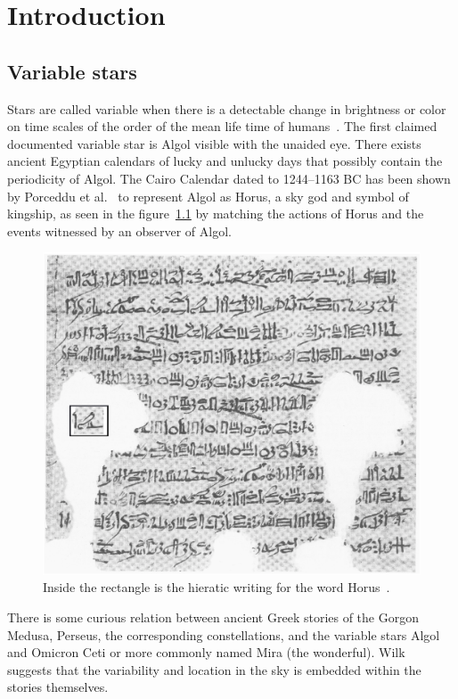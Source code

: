 \chapter{Introduction}
\label{ch:intro}

\section{Variable stars}
Stars are called variable when there is a detectable change in brightness or color on time scales of the order
of the mean life time of humans~\cite{percy_2007, sterken_1996}.
The first claimed documented variable star is Algol visible with the unaided eye.
There exists ancient Egyptian calendars of lucky and unlucky days that possibly contain the periodicity of Algol\cite{porceddu_2008, porceddu_2018}.
The Cairo Calendar dated to 1244--1163 BC has been shown by Porceddu et al.~\cite{porceddu_2015} to represent Algol as Horus, a sky god and
symbol of kingship,
as seen in the figure~\ref{fig:horus} by matching the actions of Horus and the events witnessed by an observer of Algol.

\begin{figure}[h]
    \centering
    \includegraphics[width=\columnwidth]{figures/horus.eps}
    \caption{Inside the rectangle is the hieratic writing for the word Horus~\protect\cite{porceddu_2015}.}
\label{fig:horus}
\end{figure}

There is some curious relation between ancient Greek stories of the Gorgon Medusa, Perseus, the corresponding constellations, 
and the variable stars Algol and Omicron Ceti or more commonly named Mira (the wonderful).
Wilk~\cite{wilk_1996} suggests that the variability and location in the sky is embedded within the stories themselves.

